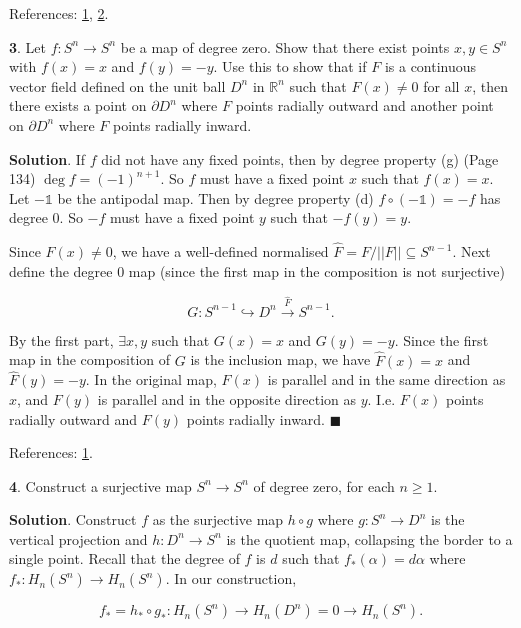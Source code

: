 \documentclass{article}
\newcommand{\R}{\mathbb{R}}
\newcommand{\identity}{\mathds{1}}
\begin{document}
References: \href{https://en.wikipedia.org/wiki/Brouwer_fixed-point_theorem}{1}, \href{https://pages.uoregon.edu/njp/635hw4solutions.pdf}{2}.
\bigskip
\bigskip

\textbf{3}. Let $f:S^{n}\to S^{n}$ be a map of degree zero. Show that there exist points $x, y\in S^{n}$ with $f(x) = x$ and $f(y) = -y$. Use this to show that if $F$ is a continuous vector field defined on the unit ball $D^{n}$ in $\R^{n}$ such that $F(x)\neq 0$ for all $x$, then there exists a point on $\partial D^{n}$ where $F$ points radially outward and another point on $\partial D^{n}$ where $F$ points radially inward.
\medskip

\textbf{Solution}. If $f$ did not have any fixed points, then by degree property (g) (Page 134) $\deg f = (-1)^{n+1}$. So $f$ must have a fixed point $x$ such that $f(x) = x$. Let $-\identity$ be the antipodal map. Then by degree property (d) $f\circ (-\identity) = -f$ has degree 0. So $-f$ must have a fixed point $y$ such that $-f(y) = y$.
\medskip

Since $F(x)\neq 0$, we have a well-defined normalised $\hat{F} = F/||F||\subseteq S^{n-1}$. Next define the degree 0 map (since the first map in the composition is not surjective)

$$G: S^{n-1}\hookrightarrow D^{n}\xrightarrow{\hat{F}} S^{n-1}.$$

By the first part, $\exists x, y$ such that $G(x) = x$ and $G(y) = -y$. Since the first map in the composition of $G$ is the inclusion map, we have $\hat{F}(x) = x$ and $\hat{F}(y) = -y$. In the original map, $F(x)$ is parallel and in the same direction as $x$, and $F(y)$ is parallel and in the opposite direction as $y$. I.e. $F(x)$ points radially outward and $F(y)$ points radially inward. $\blacksquare$
\medskip

References: \href{https://pages.uoregon.edu/njp/635hw4solutions.pdf}{1}.
\bigskip
\bigskip

\textbf{4}. Construct a surjective map $S^{n}\to S^{n}$ of degree zero, for each $n\geq 1$.
\medskip

\textbf{Solution}. Construct $f$ as the surjective map $h\circ g$ where $g: S^{n}\to D^{n}$ is the vertical projection and $h: D^{n}\to S^{n}$ is the quotient map, collapsing the border to a single point. Recall that the degree of $f$ is $d$ such that $f_{\ast}(\alpha) = d\alpha$ where $f_{\ast}: H_{n}(S^{n})\to H_{n}(S^{n})$. In our construction,

$$f_{\ast} = h_{\ast}\circ g_{\ast}: H_{n}(S^{n})\to H_{n}(D^{n}) = 0\to H_{n}(S^{n}).$$
\end{document}

